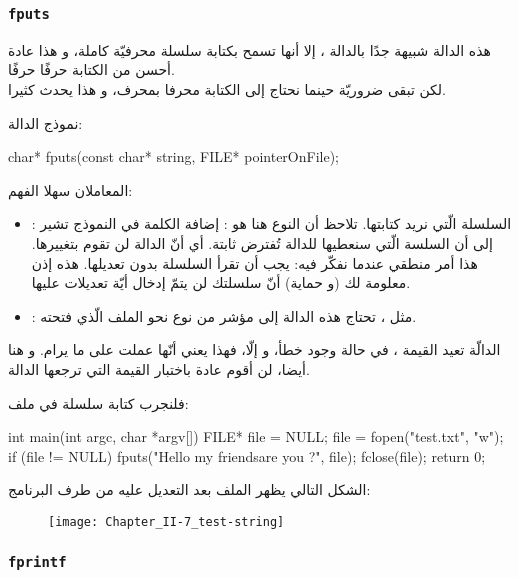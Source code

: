 \subsubsection{\texttt{fputs}}

هذه الدالة شبيهة جدًا بالدالة
،
إلا أنها تسمح بكتابة سلسلة محرفيّة كاملة، و هذا عادة أحسن من الكتابة حرفًا حرفًا.\\
لكن
تبقى ضروريّة حينما نحتاج إلى الكتابة محرفا بمحرف، و هذا يحدث كثيرا.

نموذج الدالة:

\begin{Csource}
char* fputs(const char* string, FILE* pointerOnFile);
\end{Csource}

المعاملان سهلا الفهم:
\begin{itemize}
  \item {}:
السلسلة الّتي نريد كتابتها. تلاحظ أن النوع هنا هو
:
إضافة الكلمة
في النموذج تشير إلى أن السلسة الّتي سنعطيها للدالة تُفترض ثابتة. أي أنّ الدالة لن تقوم بتغييرها. هذا أمر منطقي عندما نفكّر فيه:
يجب أن تقرأ السلسلة بدون تعديلها. هذه إذن معلومة لك (و حماية) أنّ سلسلتك لن يتمّ إدخال أيّة تعديلات عليها.
  \item {}:
 مثل
،
 تحتاج هذه الدالة إلى مؤشر من نوع
نحو الملف الّذي فتحته.
\end{itemize}

الدالّة تعيد القيمة
،
في حالة وجود خطأ، و إلّا، فهذا يعني أنّها عملت على ما يرام. و هنا أيضا، لن أقوم عادة باختبار القيمة التي ترجعها الدالة.

فلنجرب كتابة سلسلة في ملف:

\begin{Csource}
int main(int argc, char *argv[])
{
	FILE* file = NULL;
	file = fopen("test.txt", "w");
	if (file != NULL)
	{
    	 	fputs("Hello my friends\nHow are you ?", file);
    	 	fclose(file);
	}
	return 0;
}
\end{Csource}

الشكل التالي يظهر الملف بعد التعديل عليه من طرف البرنامج:

\begin{figure}[H]
	\centering
	\texttt{[image: Chapter\_II-7\_test-string]}
\end{figure}

\subsubsection{\texttt{fprintf}}

